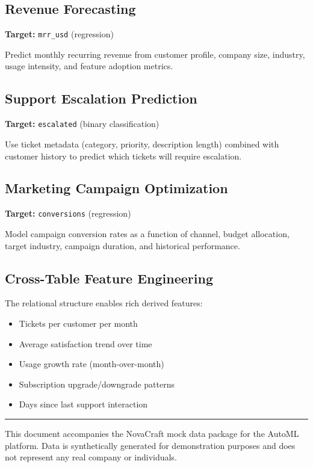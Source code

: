 \documentclass[11pt,a4paper]{article}
\begin{document}
\subsection{Revenue Forecasting}

\textbf{Target:} \texttt{mrr\_usd} (regression)

Predict monthly recurring revenue from customer profile, company size,
industry, usage intensity, and feature adoption metrics.

\subsection{Support Escalation Prediction}

\textbf{Target:} \texttt{escalated} (binary classification)

Use ticket metadata (category, priority, description length) combined with
customer history to predict which tickets will require escalation.

\subsection{Marketing Campaign Optimization}

\textbf{Target:} \texttt{conversions} (regression)

Model campaign conversion rates as a function of channel, budget allocation,
target industry, campaign duration, and historical performance.

\subsection{Cross-Table Feature Engineering}

The relational structure enables rich derived features:
\begin{itemize}[nosep]
    \item Tickets per customer per month
    \item Average satisfaction trend over time
    \item Usage growth rate (month-over-month)
    \item Subscription upgrade/downgrade patterns
    \item Days since last support interaction
\end{itemize}

\vspace{2em}
\hrule
\vspace{1em}

\begin{center}
    \textcolor{ncgray}{\small This document accompanies the NovaCraft mock data package
    for the AutoML platform. Data is synthetically generated for demonstration
    purposes and does not represent any real company or individuals.}
\end{center}
\end{document}
